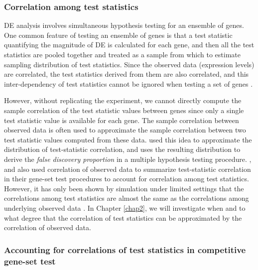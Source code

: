 \subsubsection{Correlation among test statistics}
DE analysis involves simultaneous hypothesis testing for an ensemble of genes. 
One common feature of testing an ensemble of genes is that a test statistic quantifying the 
magnitude of DE is calculated for each gene, and then all the test statistics are pooled together 
and treated as a sample from which to estimate sampling distribution of test statistics. Since the 
observed data (expression levels) are correlated, the test statistics derived from them are 
also correlated, and this inter-dependency of test statistics cannot be ignored when testing a set 
of genes \citep{barry2008statistical, efron2007correlation, wu2012camera}. 

However, without replicating the experiment, we cannot directly compute
the sample correlation %
of the test statistic values between genes since only a single test statistic
value is available for each gene. The sample correlation between observed data is often used to 
approximate the sample correlation between two test statistic values computed from these data.
\citet{efron2007correlation} used this idea to approximate the 
distribution of test-statistic correlation, and uses the resulting distribution 
to  derive the \textit{false discovery proportion} in a multiple hypothesis testing procedure. 
\citet{barry2008statistical}, \citet{wu2012camera} and
\citet{yaari2013quantitative} also used 
correlation of observed data to summarize test-statistic correlation in their
gene-set test procedures to account for correlation among test statistics.
However, it has only been shown by simulation under limited settings that the correlations among 
test statistics are almost the same as the correlations among underlying observed data 
\cite{barry2008statistical,efron2007correlation}. 
In Chapter \ref{chap2}, we will investigate when and to what degree that the correlation of test 
statistics can be approximated by the correlation of observed data.


\subsubsection{Accounting for correlations of test statistics in competitive gene-set test}

